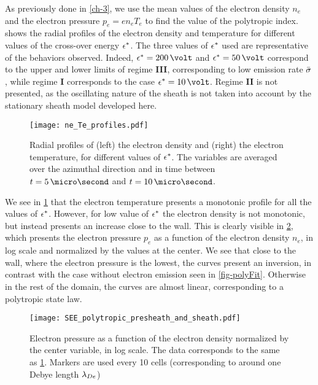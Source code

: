 As previously done in \cref{ch-3}, we use the mean values of the electron density $n_e$ and the electron pressure $ p_e = e n_e T_e$ to find the value of the polytropic index.
 shows the radial profiles of the electron density and temperature for different values of the cross-over energy $\epsilon^{*}$.
The three values of $\epsilon^{*}$ used are representative of the behaviors observed.
Indeed, $\crover=200\,\volt$ and $\crover=50\,\volt$ correspond to the upper and lower limits of regime {\bf III}, corresponding to low emission rate $ \bar{\sigma }$, while regime {\bf I} corresponds to the case $\crover=10\,\volt$.
Regime {\bf II} is not presented, as the oscillating nature of the sheath is not taken into account by the stationary sheath model developed here. 


\begin{figure}[!htb]
  \centering
  \texttt{[image: ne\_Te\_profiles.pdf]}
  \caption{Radial profiles of (left) the electron density and (right) the electron temperature, for different values of $\epsilon^{*}$. The variables are averaged over the azimuthal direction and in time between $t=5\,\micro\second$ and $t=10\,\micro\second$.  }
  \label{fig-radial_profiles_see}
\end{figure}

We see in \cref{fig-radial_profiles_see} that the electron temperature presents a monotonic profile for all the values of $\epsilon^{*}$.
However, for low value of $\epsilon^{*}$ the electron density is not monotonic, but instead presents an increase close to the wall.
This is clearly visible in \cref{fig-log_pe-ne}, which presents the electron pressure $p_e$ as a function of the electron density $n_e$, in log scale and normalized by the values at the center.
We see that close to the wall, where the electron pressure is the lowest, the curves present an inversion, in contrast with the case without electron emission seen in \cref{fig-polyFit}.
Otherwise in the rest of the domain, the curves are almost linear, corresponding to a polytropic state law.

\begin{figure}[!htb]
  \centering
  \texttt{[image: SEE\_polytropic\_presheath\_and\_sheath.pdf]}
  \caption{Electron pressure as a function of the electron density normalized by the center variable, in log scale. The data corresponds to the same as \cref{fig-radial_profiles_see}. Markers are used every 10 cells (corresponding to around one Debye length $\lambda_{De}$)}
  \label{fig-log_pe-ne}
\end{figure}

